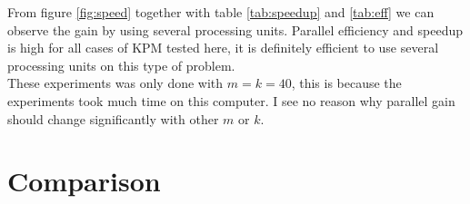 From figure \ref{fig:speed} together with table \ref{tab:speedup} and \ref{tab:eff} we can observe the gain by using several processing units. Parallel efficiency and speedup is high for all cases of KPM tested here, it is definitely efficient to use several processing units on this type of problem. \\%

These experiments was only done with $m = k = 40$, this is because the experiments took much time on this computer. I see no reason why parallel gain should change significantly with other $m$ or $k$. 

\section{Comparison} \label{sec:compare}
